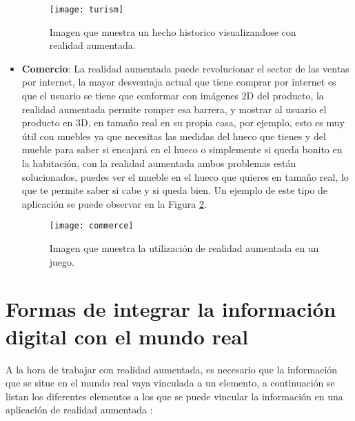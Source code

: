 \begin{itemize}
  \begin{figure}[h]
    \centering
    \texttt{[image: turism]}
    \caption{Imagen que muestra un hecho historico visualizandose con realidad aumentada. \cite{layar}}
    \label{figura-turismo}
  \end{figure}

  \newpage

  \item \textbf{Comercio}: La realidad aumentada puede revolucionar el sector de las ventas por internet, la mayor desventaja actual que tiene comprar por internet es que el usuario se tiene que conformar con imágenes 2D del producto, la realidad aumentada permite romper esa barrera, y mostrar al usuario el producto en 3D, en tamaño real en su propia casa, por ejemplo, esto es muy útil con muebles ya que necesitas las medidas del hueco que tienes y del mueble para saber si encajará en el hueco o simplemente si queda bonito en la habitación, con la realidad aumentada ambos problemas están solucionados, puedes ver el mueble en el hueco que quieres en tamaño real, lo que te permite saber si cabe y si queda bien. Un ejemplo de este tipo de aplicación se puede observar en la Figura \ref{figura-comercio}.

  \begin{figure}
    \centering
    \texttt{[image: commerce]}
    \caption{Imagen que muestra la utilización de realidad aumentada en un juego.\protect\footnotemark}
    \label{figura-comercio}
  \end{figure}


\end{itemize}

\newpage

\section{Formas de integrar la información digital con el mundo real}
A la hora de trabajar con realidad aumentada, es necesario que la información que se situe en el mundo real vaya vinculada a un elemento, a continuación se listan los diferentes elementos a los que se puede vincular la información en una aplicación de realidad aumentada \cite{prendes-espinosa}:

